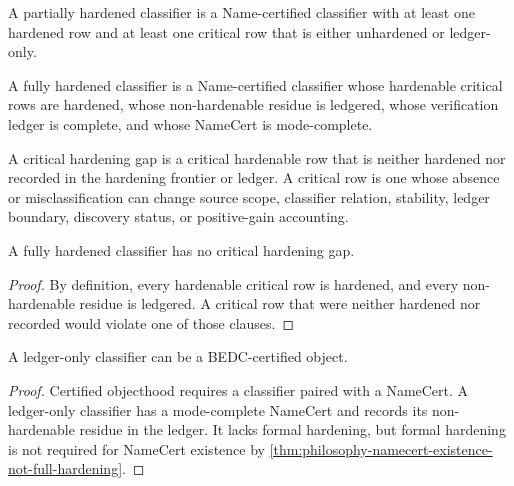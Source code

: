 \begin{definition}
\label{def:philosophy-partially-hardened-classifier}
A partially hardened classifier is a Name-certified classifier with at
least one hardened row and at least one critical row that is either
unhardened or ledger-only.
\end{definition}

\begin{definition}
\label{def:philosophy-fully-hardened-classifier}
A fully hardened classifier is a Name-certified classifier whose
hardenable critical rows are hardened, whose non-hardenable residue is
ledgered, whose verification ledger is complete, and whose NameCert is
mode-complete.
\end{definition}

\begin{definition}
\label{def:philosophy-critical-hardening-gap}
A critical hardening gap is a critical hardenable row that is neither
hardened nor recorded in the hardening frontier or ledger. A critical
row is one whose absence or misclassification can change source scope,
classifier relation, stability, ledger boundary, discovery status, or
positive-gain accounting.
\end{definition}

\begin{theorem}
\label{thm:philosophy-fully-hardened-no-critical-gap}
A fully hardened classifier has no critical hardening gap.
\end{theorem}
\begin{proof}
By definition, every hardenable critical row is hardened, and every
non-hardenable residue is ledgered. A critical row that were neither
hardened nor recorded would violate one of those clauses.
\end{proof}

\begin{theorem}
\label{thm:philosophy-ledger-only-classifiers-certified}
A ledger-only classifier can be a BEDC-certified object.
\end{theorem}
\begin{proof}
Certified objecthood requires a classifier paired with a NameCert. A
ledger-only classifier has a mode-complete NameCert and records its
non-hardenable residue in the ledger. It lacks formal hardening, but
formal hardening is not required for NameCert existence by
\autoref{thm:philosophy-namecert-existence-not-full-hardening}.
\end{proof}

